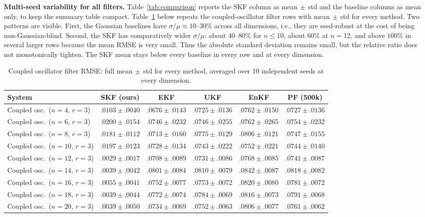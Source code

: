 \documentclass{article}
\theoremstyle{definition}
\begin{document}
\textbf{Multi-seed variability for all filters.}
Table~\ref{tab:comparison} reports the SKF column as
mean$\,\pm\,$std and the baseline columns as mean only, to keep the
summary table compact. Table~\ref{tab:comparison-full} below repeats
the coupled-oscillator filter rows with mean$\,\pm\,$std for every
method. Two patterns are visible. First, the Gaussian baselines have
$\sigma/\mu \approx 10$--$30\%$ across all dimensions, i.e., they are
seed-robust at the cost of being non-Gaussian-blind. Second, the SKF
has comparatively wider $\sigma/\mu$: about $40$--$80\%$ for
$n{\le}10$, about $60\%$ at $n{=}12$, and above $100\%$ in several
larger rows because the mean RMSE is very small. Thus the absolute
standard deviation remains small, but the relative ratio does not
monotonically tighten. The SKF mean stays below every
baseline in every row and at every dimension.

\begin{table}[ht]
\caption{Coupled oscillator filter RMSE: full mean$\,\pm\,$std for
every method, averaged over 10 independent seeds at every dimension.}
\label{tab:comparison-full}
\centering
\footnotesize
\setlength{\tabcolsep}{4pt}
\begin{tabular}{lccccc}
\toprule
\textbf{System} & \textbf{SKF (ours)} & \textbf{EKF} & \textbf{UKF} & \textbf{EnKF} & \textbf{PF (500k)} \\
\midrule
Coupled osc.\ ($n{=}4$, $r{=}3$)  & $\mathbf{.0103\!\pm\!.0040}$ & $.0676\!\pm\!.0143$ & $.0725\!\pm\!.0136$ & $.0762\!\pm\!.0150$ & $.0727\!\pm\!.0136$ \\
Coupled osc.\ ($n{=}6$, $r{=}3$)  & $\mathbf{.0200\!\pm\!.0154}$ & $.0746\!\pm\!.0232$ & $.0746\!\pm\!.0255$ & $.0762\!\pm\!.0265$ & $.0754\!\pm\!.0232$ \\
Coupled osc.\ ($n{=}8$, $r{=}3$)  & $\mathbf{.0181\!\pm\!.0112}$ & $.0713\!\pm\!.0160$ & $.0775\!\pm\!.0129$ & $.0806\!\pm\!.0121$ & $.0747\!\pm\!.0155$ \\
Coupled osc.\ ($n{=}10$, $r{=}3$) & $\mathbf{.0197\!\pm\!.0123}$ & $.0728\!\pm\!.0134$ & $.0743\!\pm\!.0222$ & $.0752\!\pm\!.0221$ & $.0744\!\pm\!.0140$ \\
Coupled osc.\ ($n{=}12$, $r{=}3$) & $\mathbf{.0029\!\pm\!.0017}$ & $.0708\!\pm\!.0089$ & $.0731\!\pm\!.0086$ & $.0768\!\pm\!.0085$ & $.0741\!\pm\!.0087$ \\
Coupled osc.\ ($n{=}14$, $r{=}3$) & $\mathbf{.0039\!\pm\!.0042}$ & $.0801\!\pm\!.0084$ & $.0810\!\pm\!.0079$ & $.0842\!\pm\!.0087$ & $.0818\!\pm\!.0082$ \\
Coupled osc.\ ($n{=}16$, $r{=}3$) & $\mathbf{.0055\!\pm\!.0041}$ & $.0752\!\pm\!.0077$ & $.0773\!\pm\!.0072$ & $.0820\!\pm\!.0080$ & $.0781\!\pm\!.0072$ \\
Coupled osc.\ ($n{=}18$, $r{=}3$) & $\mathbf{.0039\!\pm\!.0044}$ & $.0772\!\pm\!.0074$ & $.0784\!\pm\!.0069$ & $.0816\!\pm\!.0073$ & $.0791\!\pm\!.0068$ \\
Coupled osc.\ ($n{=}20$, $r{=}3$) & $\mathbf{.0039\!\pm\!.0050}$ & $.0734\!\pm\!.0069$ & $.0752\!\pm\!.0063$ & $.0806\!\pm\!.0077$ & $.0761\!\pm\!.0062$ \\
\bottomrule
\end{tabular}
\end{table}
\end{document}
